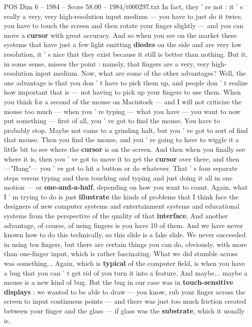 \begin{textsample}{POS Dim 6 – 1984 – Score 58.00 – 1984/t000297.txt}
In fact, they ' re not : it ' s really a very, very high-resolution input medium — you have to just do it twice, you have to touch the screen and then rotate your finger slightly — and you can move a \textbf{cursor} with great accuracy.
And so when you see on the market these systems that have just a few light emitting \textbf{diodes} on the side and are very low resolution, it ' s nice that they exist because it still is better than nothing.
But it, in some sense, misses the point : namely, that fingers are a very, very high-resolution input medium.
Now, what are some of the other advantages?
Well, the one advantage is that you don ' t have to pick them up, and people don ' t realize how important that is — not having to pick up your fingers to use them.
When you think for a second of the mouse on Macintosh — and I will not criticize the mouse too much — when you ' re typing — what you have — you want to now put something — first of all, you ' ve got to find the mouse.
You have to probably stop.
Maybe not come to a grinding halt, but you ' ve got to sort of find that mouse.
Then you find the mouse, and you ' re going to have to wiggle it a little bit to see where the \textbf{cursor} is on the screen.
And then when you finally see where it is, then you ' ve got to move it to get the \textbf{cursor} over there, and then —"Bang"— you ' ve got to hit a button or do whatever.
That ' s four separate steps versus typing and then touching and typing and just doing it all in one motion — or \textbf{one-and-a-half}, depending on how you want to count.
Again, what I ' m trying to do is just \textbf{illustrate} the kinds of problems that I think face the designers of new computer systems and entertainment systems and educational systems from the perspective of the quality of that \textbf{interface}.
And another advantage, of course, of using fingers is you have 10 of them.
And we have never known how to do this technically, so this slide is a fake slide.
We never succeeded in using ten fingers, but there are certain things you can do, obviously, with more than one-finger input, which is rather fascinating.
What we did stumble across was something...
Again, which is \textbf{typical} of the computer field, is when you have a bug that you can ' t get rid of you turn it into a feature.
And maybe... maybe a mouse is a new kind of bug.
But the bug in our case was in \textbf{touch-sensitive} \textbf{displays} : we wanted to be able to draw — you know, rub your finger across the screen to input continuous points — and there was just too much friction created between your finger and the glass — if glass was the \textbf{substrate}, which it usually is.

\end{textsample}
